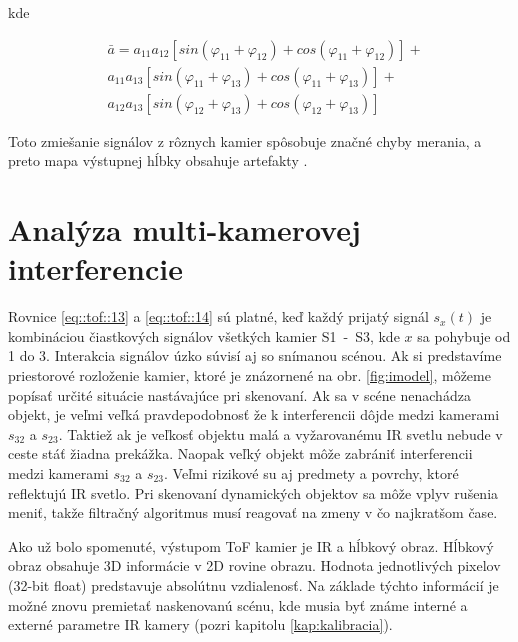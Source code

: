 kde

\begin{equation}
\label{eq::tof::15}
\begin{aligned}
&{\bar{a}} = {a_{11}a_{12}[sin({\varphi_{11}+\varphi_{12}}) + cos({\varphi_{11}+\varphi_{12}})]} + \\  
&{a_{11}a_{13}[sin({\varphi_{11}+\varphi_{13}}) + cos ({\varphi_{11}+\varphi_{13}})]} + \\
&{a_{12}a_{13}[sin({\varphi_{12}+\varphi_{13}}) + cos ({\varphi_{12}+\varphi_{13}})]}
\end{aligned}
\end{equation}

Toto zmiešanie signálov z rôznych kamier spôsobuje značné chyby merania, a preto mapa výstupnej hĺbky obsahuje artefakty \cite{Litehua}.

\section{Analýza multi-kamerovej interferencie}

Rovnice \ref{eq::tof::13} a \ref{eq::tof::14} sú platné, keď každý prijatý signál $s_{x}(t)$ je kombináciou čiastkových signálov všetkých kamier S1\, - \,S3, kde $x$ sa pohybuje od 1 do 3.
Interakcia signálov úzko súvisí aj so snímanou scénou. Ak si predstavíme priestorové rozloženie kamier, ktoré je znázornené na obr. \ref{fig:imodel}, môžeme popísať určité situácie nastávajúce pri skenovaní. Ak sa v scéne nenachádza objekt, je veľmi veľká pravdepodobnosť že k interferencii dôjde medzi kamerami $s_{32}$ a $s_{23}$. Taktiež ak je veľkosť objektu malá a vyžarovanému IR svetlu nebude v ceste stáť žiadna prekážka. Naopak veľký objekt môže zabrániť interferencii medzi kamerami $s_{32}$ a $s_{23}$. Veľmi rizikové su aj predmety a povrchy, ktoré reflektujú IR svetlo. Pri skenovaní dynamických objektov sa môže vplyv rušenia meniť, takže filtračný algoritmus musí reagovať na zmeny v čo najkratšom čase.

Ako už bolo spomenuté, výstupom ToF kamier je IR a hĺbkový obraz.  Hĺbkový obraz obsahuje 3D informácie v 2D rovine obrazu. Hodnota jednotlivých pixelov (32-bit float) predstavuje absolútnu vzdialenosť. Na základe týchto informácií je možné znovu premietať naskenovanú scénu, kde musia byť známe interné a externé parametre IR kamery (pozri kapitolu \ref{kap:kalibracia}).

